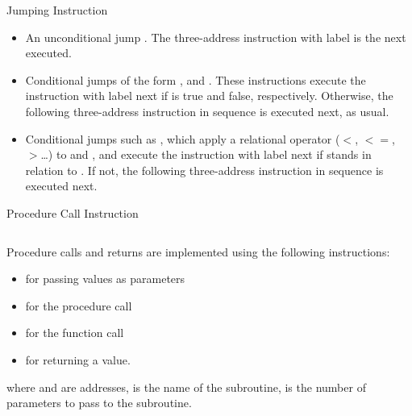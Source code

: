 \begin{bibunit}[apalike]
\begin{frame}{Jumping Instruction}
	\begin{itemize}
	\item An unconditional jump \emph{}. The three-address instruction with label  is the next executed.
	\vfill
	\item Conditional jumps of the form \emph{}, and \emph{}. These instructions execute the instruction with label  next if  is true and false, respectively. Otherwise, the following three-address instruction in sequence is executed next, as usual.
	\vfill
	\item Conditional jumps such as \emph{}, which apply a relational operator ($<$, $<=$, $>$\dots) to  and , and execute the instruction with label  next if  stands in relation  to . If not, the following three-address instruction in sequence is executed next.
	\end{itemize}
\end{frame}

\begin{frame}{Procedure Call Instruction}
	\begin{columns}
		\begin{column}{.8\linewidth}
		\begin{small}
		Procedure calls and returns are implemented using the following instructions:
		\vfill
		\begin{itemize}
		\item {} for passing values as parameters
		\vfill
		\item {} for the procedure call
		\vfill
		\item {} for the function call
		\vfill
		\item {} for returning a value.
		\end{itemize}
		\vfill
		where  and  are addresses,  is the name of the subroutine,  is the number of parameters to pass to the subroutine.
		\end{small}
		\end{column}
		\begin{column}{.2\linewidth}
			\begin{tac}[\linewidth]
				\tacdots
			\end{tac}
		\end{column}
	\end{columns}
	\vfill
\end{frame}


\end{bibunit}
